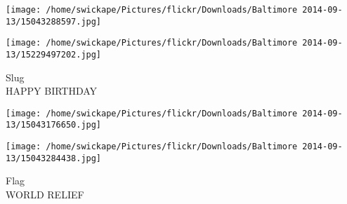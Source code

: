 \documentclass[10pt,letterpaper]{article}
\begin{document}
\texttt{[image: /home/swickape/Pictures/flickr/Downloads/Baltimore 2014-09-13/15043288597.jpg]}

\vspace{0.25in}
\texttt{[image: /home/swickape/Pictures/flickr/Downloads/Baltimore 2014-09-13/15229497202.jpg]}

Slug\\
HAPPY BIRTHDAY
\pagebreak

\texttt{[image: /home/swickape/Pictures/flickr/Downloads/Baltimore 2014-09-13/15043176650.jpg]}

\vspace{0.25in}
\texttt{[image: /home/swickape/Pictures/flickr/Downloads/Baltimore 2014-09-13/15043284438.jpg]}

Flag\\
WORLD RELIEF
\pagebreak
\end{document}
